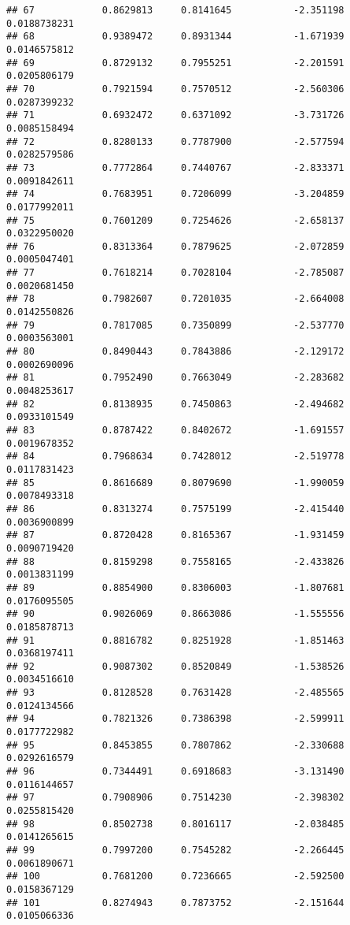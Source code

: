 \documentclass[]{article}
\begin{document}
\begin{verbatim}
## 67            0.8629813     0.8141645           -2.351198  0.0188738231
## 68            0.9389472     0.8931344           -1.671939  0.0146575812
## 69            0.8729132     0.7955251           -2.201591  0.0205806179
## 70            0.7921594     0.7570512           -2.560306  0.0287399232
## 71            0.6932472     0.6371092           -3.731726  0.0085158494
## 72            0.8280133     0.7787900           -2.577594  0.0282579586
## 73            0.7772864     0.7440767           -2.833371  0.0091842611
## 74            0.7683951     0.7206099           -3.204859  0.0177992011
## 75            0.7601209     0.7254626           -2.658137  0.0322950020
## 76            0.8313364     0.7879625           -2.072859  0.0005047401
## 77            0.7618214     0.7028104           -2.785087  0.0020681450
## 78            0.7982607     0.7201035           -2.664008  0.0142550826
## 79            0.7817085     0.7350899           -2.537770  0.0003563001
## 80            0.8490443     0.7843886           -2.129172  0.0002690096
## 81            0.7952490     0.7663049           -2.283682  0.0048253617
## 82            0.8138935     0.7450863           -2.494682  0.0933101549
## 83            0.8787422     0.8402672           -1.691557  0.0019678352
## 84            0.7968634     0.7428012           -2.519778  0.0117831423
## 85            0.8616689     0.8079690           -1.990059  0.0078493318
## 86            0.8313274     0.7575199           -2.415440  0.0036900899
## 87            0.8720428     0.8165367           -1.931459  0.0090719420
## 88            0.8159298     0.7558165           -2.433826  0.0013831199
## 89            0.8854900     0.8306003           -1.807681  0.0176095505
## 90            0.9026069     0.8663086           -1.555556  0.0185878713
## 91            0.8816782     0.8251928           -1.851463  0.0368197411
## 92            0.9087302     0.8520849           -1.538526  0.0034516610
## 93            0.8128528     0.7631428           -2.485565  0.0124134566
## 94            0.7821326     0.7386398           -2.599911  0.0177722982
## 95            0.8453855     0.7807862           -2.330688  0.0292616579
## 96            0.7344491     0.6918683           -3.131490  0.0116144657
## 97            0.7908906     0.7514230           -2.398302  0.0255815420
## 98            0.8502738     0.8016117           -2.038485  0.0141265615
## 99            0.7997200     0.7545282           -2.266445  0.0061890671
## 100           0.7681200     0.7236665           -2.592500  0.0158367129
## 101           0.8274943     0.7873752           -2.151644  0.0105066336

\end{verbatim}
\end{document}
